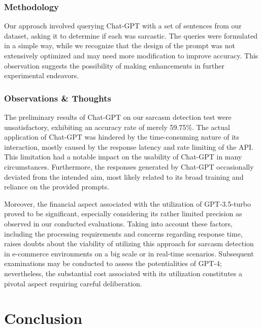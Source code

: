 \documentclass[10pt,twocolumn,letterpaper]{article}
\begin{document}
\subsubsection{Methodology}
Our approach involved querying Chat-GPT with a set of sentences from our dataset, asking it to determine if each was sarcastic.
The queries were formulated in a simple way, while we recognize that the design of the prompt was not extensively optimized and may need more modification to improve accuracy.
This observation suggests the possibility of making enhancements in further experimental endeavors.

\subsubsection{Observations \& Thoughts}
The preliminary results of Chat-GPT on our sarcasm detection test were unsatisfactory, exhibiting an accuracy rate of merely 59.75\%.
The actual application of Chat-GPT was hindered by the time-consuming nature of its interaction, mostly caused by the response latency and rate limiting of the API. This limitation had a notable impact on the usability of Chat-GPT in many circumstances.
Furthermore, the responses generated by Chat-GPT occasionally deviated from the intended aim, most likely related to its broad training and reliance on the provided prompts.

Moreover, the financial aspect associated with the utilization of GPT-3.5-turbo proved to be significant, especially considering its rather limited precision as observed in our conducted evaluations.
Taking into account these factors, including the processing requirements and concerns regarding response time, raises doubts about the viability of utilizing this approach for sarcasm detection in e-commerce environments on a big scale or in real-time scenarios.
Subsequent examinations may be conducted to assess the potentialities of GPT-4; nevertheless, the substantial cost associated with its utilization constitutes a pivotal aspect requiring careful deliberation.


\section{Conclusion}
\end{document}
